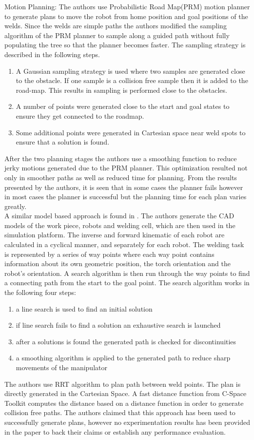 Motion Planning: The authors use Probabilistic Road Map(PRM) motion planner to generate plans to move the robot from home position and goal positions of the welds. Since the welds are simple paths the authors modified the sampling algorithm of the PRM planner to sample along a guided path without fully populating the tree so that the planner becomes faster. The sampling strategy is described in the following steps.
\begin{enumerate}
\item A Gaussian sampling strategy is used where two samples are generated close to the obstacle. If one sample is a collision free sample then it is added to the road-map. This results in sampling is performed close to the obstacles.
\item A number of points were generated close to the start and goal states to ensure they get connected to the roadmap.
\item Some additional points were generated in Cartesian space near weld spots to ensure that a solution is found.
\end{enumerate}
After the two planning stages the authors use a smoothing function to reduce jerky motions generated due to the PRM planner. This optimization resulted not only in smoother paths as well as reduced time for planning. From the results presented by the authors, it is seen that in some cases the planner fails however in most cases the planner is successful but the planning time for each plan varies greatly. \\
A similar model based approach is found in \citet{Ames}. The authors generate the CAD models of the work piece, robots and welding cell, which are then used in the simulation platform. The inverse and forward kinematic of each robot are calculated in a cyclical manner, and separately for each robot. The welding task is represented by a series of way points where each way point contains information about its own geometric position, the torch orientation and the robot's orientation. A search algorithm is then run through the way points to find a connecting path from the start to the goal point. The search algorithm works in the following four steps:
\begin{enumerate}
\item a line search is used to find an initial solution
\item if line search fails to find a solution an exhaustive search is launched
\item after a solutions is found the generated path is checked for discontinuities
\item a smoothing algorithm is applied to the generated path to reduce sharp movements of the manipulator
\end{enumerate}
The authors use RRT algorithm to plan path between weld points. The plan is directly generated in the Cartesian Space. A fast distance function from C-Space Toolkit computes the distance based on a distance function in order to generate collision free paths. The authors claimed that this approach has been used to successfully generate plans, however no experimentation results has been provided in the paper to back their claims or establish any performance evaluation. 
